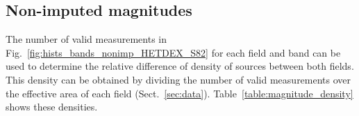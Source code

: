 \documentclass{aa}
\begin{document}
\begin{appendix}
\section{Non-imputed magnitudes}\label{sec:app_nonimputed_mag_dist}

The number of valid measurements in Fig.~\ref{fig:hists_bands_nonimp_HETDEX_S82} for each field and band can be used to determine the relative difference of density of sources between both fields. This density can be obtained by dividing the number of valid measurements over the effective area of each field (Sect.~\ref{sec:data}). Table~\ref{table:magnitude_density} shows these densities.

\begin{table}
\setlength{\tabcolsep}{2.9pt}
\caption{Density of detected sources (in units of sources per square degree) per band and field.}             %
\label{table:magnitude_density}      %
\centering                          %
\end{table}



\end{appendix}
\end{document}
